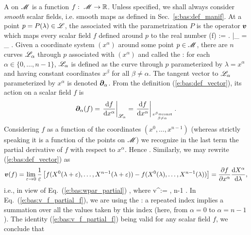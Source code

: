 A  on $\mathscr{M}$ is a function
$f:\ \mathscr{M} \rightarrow \mathbb{R}$. Unless specified, we shall always consider \emph{smooth} scalar fields,
i.e. smooth maps as defined in Sec.~\ref{s:bas:def_manif}. At a point $p=P(\lambda)\in\mathscr{L}$, the  associated with the parametrization
$P$ is the operator $\bm{v}$ which maps every scalar field $f$ defined around
$p$ to the real number
\be \label{e:bas:def_vector}
  (f) := \left.  \right|_{\Li} =
  \lim_{\veps{}} 
   .
\ee
Given a coordinate system $(x^\alpha)$ around some point $p\in\mathscr{M}$, there are
$n$ curves $\mathscr{L}_\alpha$ through $p$ associated with $(x^\alpha)$ and called the
:
for each $\alpha\in\{0,\ldots,n-1\}$, $\mathscr{L}_\alpha$ is defined as the curve through $p$ parameterized by $\lambda = x^\alpha$ and having constant coordinates
$x^\beta$ for all $\beta\not=\alpha$.
The tangent vector to $\mathscr{L}_\alpha$ parameterized by $x^\alpha$ is
denoted $\bm{\partial}_\alpha$. From the definition (\ref{e:bas:def_vector}), its
action on a scalar field $f$ is
\[
  \bm{\partial}_\alpha(f) =
  \left. \frac{\mathrm{d} f}{\mathrm{d} x^\alpha} \right|_{\mathscr{L}_\alpha}
  = \left. \frac{\mathrm{d} f}{\mathrm{d} x^\alpha} \right|_{x^\beta={\rm const}\atop \beta\not=\alpha} .
\]
Considering $f$ as a function of
the coordinates $(x^0,\ldots,x^{n-1})$ (whereas strictly speaking it is a function
of the points on $\mathscr{M}$) we recognize in the last term the partial derivative of
$f$ with respect to $x^\alpha$. Hence
\be \label{e:bas:wpar_partial}
  .
\ee
Similarly, we may rewrite (\ref{e:bas:def_vector}) as
\[
\bm{v}(f) = \lim_{\varepsilon\rightarrow 0} \frac{1}{\varepsilon}
  \left[ f(X^0(\lambda+\varepsilon),\ldots,X^{n-1}(\lambda+\varepsilon))
  - f(X^0(\lambda),\ldots,X^{n-1}(\lambda)) \right]
  = \frac{\partial f}{\partial x^\alpha} \frac{\mathrm{d} X^\alpha}{\mathrm{d} \lambda} ,
\]
i.e., in view of Eq.~(\ref{e:bas:wpar_partial})
\be \label{e:bas:v_f_partial_f}
   ,
\ee
where
\be \label{e:bas:va_dXadlamb}
  v^\alpha :=  ,  \leq \alpha\leq n-1 .
\ee
In Eq.~(\ref{e:bas:v_f_partial_f}),
we are using the : a repeated index implies a summation over all the values taken by this index
(here, from $\alpha=0$ to $\alpha=n-1$).
The identity (\ref{e:bas:v_f_partial_f}) being valid for any scalar field $f$, we conclude that
